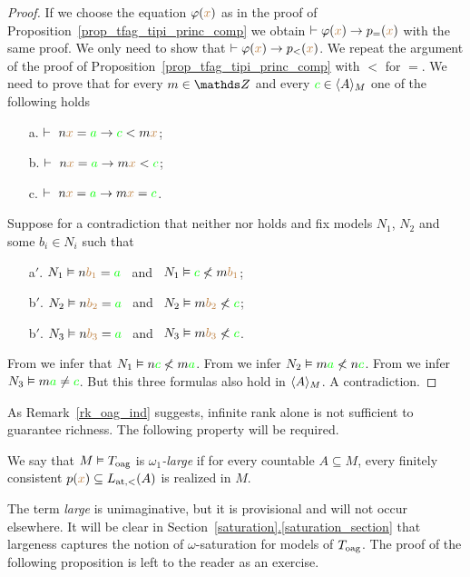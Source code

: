 \begin{proof}
  If we choose the equation $\phi({\mr x})$ as in the proof of Proposition~\ref{prop_tfag_tipi_princ_comp} we obtain $\proves\phi({\mr x})\imp p_{=}({\mr x})$ with the same proof.
  We only need to show that $\proves\phi({\mr x})\imp p_{<}({\mr x})$.
  We repeat the argument of the proof of Proposition~\ref{prop_tfag_tipi_princ_comp} with $<$ for $=$.
  We need to prove that for every $m\in\ZZ$ and every ${\gr c}\in\<A\>_M$ one of the following holds
  \begin{itemize}
  \item[a.] $\proves\   n{\mr x}={\gr a}\imp{\gr c}<m{\mr x}$;
  \item[b.] $\proves\   n{\mr x}={\gr a}\imp m{\mr x}<{\gr c}$;
  \item[c.] $\proves\   n{\mr x}={\gr a}\imp m{\mr x}={\gr c}$.
  \end{itemize}
  Suppose for a contradiction that neither  nor  holds and fix models $N_1$, $N_2$ and some $b_i\in N_i$ such that
  \begin{itemize}
  \item[a$'$.] $N_1\models n{\mr b_1}={\gr a}$ \ and \ $N_1\models {\gr c}\not<m{\mr b_1}$;
  \item[b$'$.] $N_2\models n{\mr b_2}={\gr a}$ \ and \ $N_2\models m{\mr b_2}\not< {\gr c}$;
  \item[b$'$.] $N_3\models n{\mr b_3}={\gr a}$ \ and \ $N_3\models m{\mr b_3}\not< {\gr c}$.
  \end{itemize}
  From  we infer that $N_1\models n{\gr c}\not<m{\gr a}$.
  From  we infer $N_2\models m{\gr a}\not<n{\gr c}$.
  From  we infer $N_3\models m{\gr a}\neq{\gr c}$. 
  But this three formulas also hold in $\<A\>_M$.
  A contradiction.
\end{proof}

As Remark~\ref{rk_oag_ind} suggests, infinite rank alone is not sufficient to guarantee richness.
%
The following property will be required.
\begin{definition}
  We say that $M\models T_{\rm oag}$ is \emph{$\omega_1$-large\/} if for every countable $A\subseteq M$, every finitely consistent $p({\mr x})\subseteq L_{\rm at, <}(A)$ is realized in $M$.\QED
\end{definition}

%
The term \textit{large\/} is unimaginative, but it is provisional and will not occur elsewhere.
%
It will be clear in Section~\hyperref[saturation_section]{\ref*{saturation}.\ref*{saturation_section}} that largeness captures the notion of $\omega$-saturation for models of $T_{\rm oag}$. The proof of the following proposition is left to the reader as an exercise.

